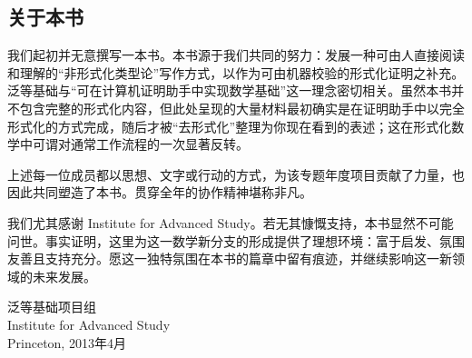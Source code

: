 \subsection*{关于本书}

我们起初并无意撰写一本书。本书源于我们共同的努力：发展一种可由人直接阅读和理解的“非形式化类型论”写作方式，以作为可由机器校验的形式化证明之补充。
泛等基础与“可在计算机证明助手中实现数学基础”这一理念密切相关。虽然本书并不包含完整的形式化内容，但此处呈现的大量材料最初确实是在证明助手中以完全形式化的方式完成，随后才被“去形式化”整理为你现在看到的表述；这在形式化数学中可谓对通常工作流程的一次显著反转。

上述每一位成员都以思想、文字或行动的方式，为该专题年度项目贡献了力量，也因此共同塑造了本书。贯穿全年的协作精神堪称非凡。

\mentalpause

我们尤其感谢 Institute for Advanced Study。若无其慷慨支持，本书显然不可能问世。事实证明，这里为这一数学新分支的形成提供了理想环境：富于启发、氛围友善且支持充分。愿这一独特氛围在本书的篇章中留有痕迹，并继续影响这一新领域的未来发展。

\bigskip

\begin{flushright}
泛等基础项目组\\
Institute for Advanced Study\\
Princeton, 2013年4月
\end{flushright}

